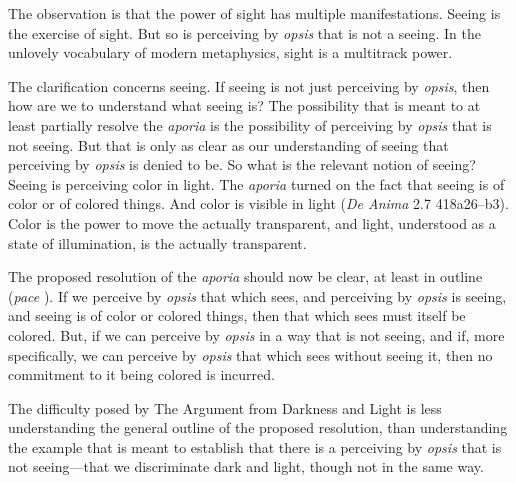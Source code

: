 The observation is that the power of sight has multiple manifestations. Seeing is the exercise of sight. But so is perceiving by \emph{opsis} that is not a seeing. In the unlovely vocabulary of modern metaphysics, sight is a multitrack power. 

The clarification concerns seeing. If seeing is not just perceiving by \emph{opsis}, then how are we to understand what seeing is? The possibility that is meant to at least partially resolve the \emph{aporia} is the possibility of perceiving by \emph{opsis} that is not seeing. But that is only as clear as our understanding of seeing that perceiving by \emph{opsis} is denied to be. So what is the relevant notion of seeing? Seeing is perceiving color in light. The \emph{aporia} turned on the fact that seeing is of color or of colored things. And color is visible in light (\emph{De Anima} 2.7 418a26–b3). Color is the power to move the actually transparent, and light, understood as a state of illumination, is the actually transparent.

The proposed resolution of the \emph{aporia} should now be clear, at least in outline (\emph{pace} \citealt[122]{Hamlyn:2002ys}). If we perceive by \emph{opsis} that which sees, and perceiving by \emph{opsis} is seeing, and seeing is of color or colored things, then that which sees must itself be colored. But, if we can perceive by \emph{opsis} in a way that is not seeing, and if, more specifically, we can perceive by \emph{opsis} that which sees without seeing it, then no commitment to it being colored is incurred.

The difficulty posed by The Argument from Darkness and Light is less understanding the general outline of the proposed resolution, than understanding the example that is meant to establish that there is a perceiving by \emph{opsis} that is not seeing—that we discriminate dark and light, though not in the same way.

